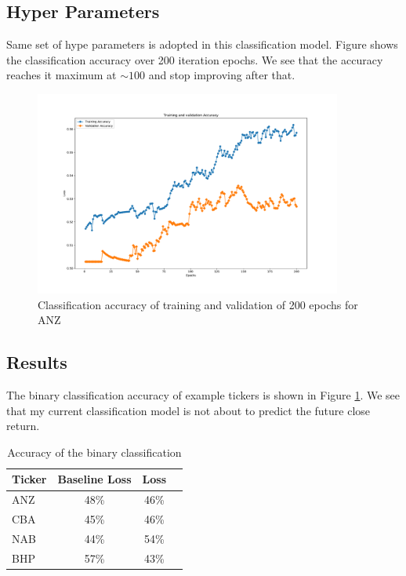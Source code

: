 \documentclass[a4paper, 11pt, usenatbib]{article}
\begin{document}
\subsection{Hyper Parameters}
Same set of hype parameters is adopted in this classification model. Figure	\label{fig:classification_epochs} shows the classification accuracy over 200 iteration epochs. We see that the accuracy reaches it maximum at $\sim 100$ and stop improving after that.
\begin{figure}
	\centering
	\includegraphics[width=0.9\textwidth]{./figures/classification_epochs.pdf}
	\caption[]
	{Classification accuracy of training and validation of 200 epochs for ANZ}
		\label{fig:classification_epochs}
\end{figure}

\subsection{Results}
The binary classification accuracy of example tickers is shown in Figure \ref{tab:classification_accuracy}. We see that my current classification model is not about to predict the future close return.
\begin{table}
 \caption{Accuracy of the binary classification}
 \label{tab:classification_accuracy}
 \centering
 \begin{tabular}
 { l  c  c  l }
  \hline
 Ticker & Baseline Loss & Loss\\
 \hline
 ANZ & 48\% & 46\% \\
 CBA & 45\% & 46\% \\
 NAB & 44\% & 54\%\\
 BHP & 57\% & 43\% &\\

  \hline
 \end{tabular}
\end{table}  
\end{document}

